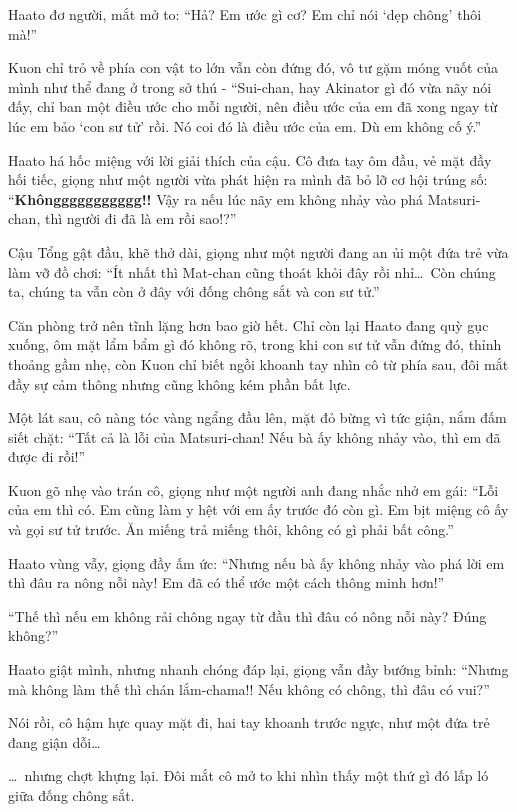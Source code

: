 \documentclass[../main.tex]{subfiles}
\begin{document}
Haato đơ người, mắt mở to: ``Hả? Em ước gì cơ? Em chỉ nói `dẹp chông' thôi mà!''

Kuon chỉ trỏ về phía con vật to lớn vẫn còn đứng đó, vô tư gặm móng vuốt của mình như thể đang ở trong sở thú - ``Sui-chan, hay Akinator gì đó vừa nãy nói đấy, chỉ ban một điều ước cho mỗi người, nên điều ước của em đã xong ngay từ lúc em bảo `con sư tử' rồi. Nó coi đó là điều ước của em. Dù em không cố ý.''

Haato há hốc miệng với lời giải thích của cậu. Cô đưa tay ôm đầu, vẻ mặt đầy hối tiếc, giọng như một người vừa phát hiện ra mình đã bỏ lỡ cơ hội trúng số: ``\textbf{Khônggggggggggg!!} Vậy ra nếu lúc nãy em không nhảy vào phá Matsuri-chan, thì người đi đã là em rồi sao!?''

Cậu Tổng gật đầu, khẽ thở dài, giọng như một người đang an ủi một đứa trẻ vừa làm vỡ đồ chơi: ``Ít nhất thì Mat-chan cũng thoát khỏi đây rồi nhỉ\dots\ Còn chúng ta, chúng ta vẫn còn ở đây với đống chông sắt và con sư tử.''

Căn phòng trở nên tĩnh lặng hơn bao giờ hết. Chỉ còn lại Haato đang quỳ gục xuống, ôm mặt lẩm bẩm gì đó không rõ, trong khi con sư tử vẫn đứng đó, thỉnh thoảng gầm nhẹ, còn Kuon chỉ biết ngồi khoanh tay nhìn cô từ phía sau, đôi mắt đầy sự cảm thông nhưng cũng không kém phần bất lực.


Một lát sau, cô nàng tóc vàng ngẩng đầu lên, mặt đỏ bừng vì tức giận, nắm đấm siết chặt: ``Tất cả là lỗi của Matsuri-chan! Nếu bà ấy không nhảy vào, thì em đã được đi rồi!''

Kuon gõ nhẹ vào trán cô, giọng như một người anh đang nhắc nhở em gái: ``Lỗi của em thì có. Em cũng làm y hệt với em ấy trước đó còn gì. Em bịt miệng cô ấy và gọi sư tử trước. Ăn miếng trả miếng thôi, không có gì phải bất công.''

Haato vùng vẫy, giọng đầy ấm ức: ``Nhưng nếu bà ấy không nhảy vào phá lời em thì đâu ra nông nỗi này! Em đã có thể ước một cách thông minh hơn!''

``Thế thì nếu em không rải chông ngay từ đầu thì đâu có nông nỗi này? Đúng không?''

Haato giật mình, nhưng nhanh chóng đáp lại, giọng vẫn đầy bướng bỉnh: ``Nhưng mà không làm thế thì chán lắm-chama!! Nếu không có chông, thì đâu có vui?''

Nói rồi, cô hậm hực quay mặt đi, hai tay khoanh trước ngực, như một đứa trẻ đang giận dỗi\dots

\dots\ nhưng chợt khựng lại. Đôi mắt cô mở to khi nhìn thấy một thứ gì đó lấp ló giữa đống chông sắt.
\end{document}
